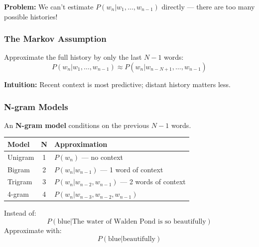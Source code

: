 \textbf{Problem:} We can't estimate $P(w_n | w_1, \ldots, w_{n-1})$ directly --- there are too many possible histories!

\separator

\subsubsection{The Markov Assumption}

\begin{defbox}
Approximate the full history by only the last $N-1$ words:
\[
P(w_n | w_1, \ldots, w_{n-1}) \approx P(w_n | w_{n-N+1}, \ldots, w_{n-1})
\]

\textbf{Intuition:} Recent context is most predictive; distant history matters less.
\end{defbox}

\separator

\subsubsection{N-gram Models}

\begin{defbox}
An \textbf{N-gram model} conditions on the previous $N-1$ words.

\begin{center}
\renewcommand{\arraystretch}{1.3}
\begin{tabular}{@{} l c l @{}}
\toprule
\textbf{Model} & \textbf{N} & \textbf{Approximation} \\
\midrule
Unigram & 1 & $P(w_n)$ --- no context \\
Bigram & 2 & $P(w_n | w_{n-1})$ --- 1 word of context \\
Trigram & 3 & $P(w_n | w_{n-2}, w_{n-1})$ --- 2 words of context \\
4-gram & 4 & $P(w_n | w_{n-3}, w_{n-2}, w_{n-1})$ \\
\bottomrule
\end{tabular}
\end{center}
\end{defbox}

\begin{exbox}
Instead of:
\[
P(\text{blue} | \text{The water of Walden Pond is so beautifully})
\]
Approximate with:
\[
P(\text{blue} | \text{beautifully})
\]
\end{exbox}


